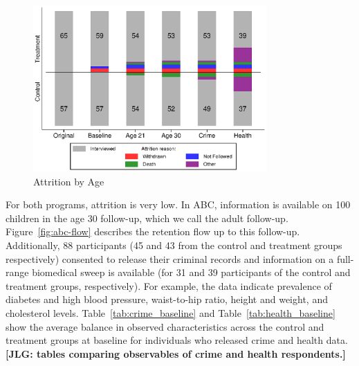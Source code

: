 \begin{figure}[H]
\caption{Attrition by Age} \label{fig:attrition}
    \centering
  \includegraphics[height=2.5in]{output/abc_attrition.eps}
\end{figure}

\noindent For both programs, attrition is very low. In ABC, information is available on 100 children in the age 30 follow-up, which we call the adult follow-up. Figure~\ref{fig:abc-flow} describes the retention flow up to this follow-up. Additionally, 88 participants (45 and 43 from the control and treatment groups respectively) consented to release their criminal records and information on a full-range biomedical sweep is available (for 31 and 39 participants of the control and treatment groups, respectively). For example, the data indicate prevalence of diabetes and high blood pressure, waist-to-hip ratio, height and weight, and cholesterol levels. Table~\ref{tab:crime_baseline} and Table~\ref{tab:health_baseline} show the average balance in observed characteristics across the control and treatment groups at  baseline for individuals who released crime and health data.\\

\noindent \textbf{[JLG: tables comparing observables of crime and health respondents.]}

